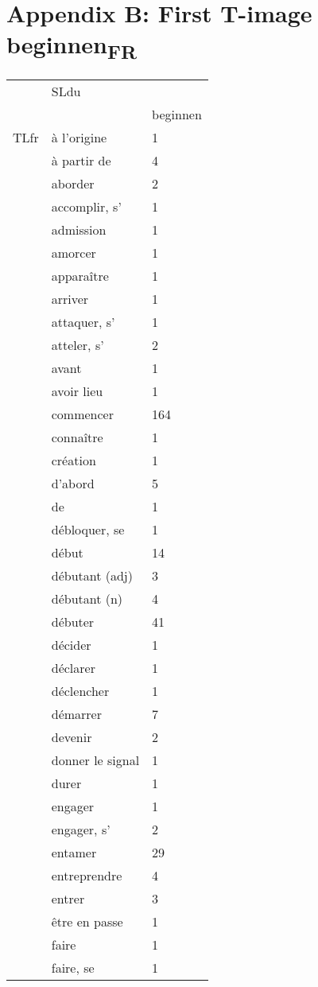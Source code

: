 \section{Appendix B: First T-image beginnen\textsubscript{FR}}
\begin{tabularx}{\textwidth}{XXX}
\lsptoprule
\multicolumn{2}{c}{} & SLdu\\
\hhline{~~-} &  & beginnen\\
\multicolumn{1}{c}{TLfr} & à l'origine &  1\\
& à partir de &  4\\
& aborder &  2\\
& accomplir, s' &  1\\
& admission &  1\\
& amorcer &  1\\
& apparaître &  1\\
& arriver &  1\\
& attaquer, s' &  1\\
& atteler, s' &  2\\
& avant &  1\\
& avoir lieu &  1\\
& commencer &  164\\
& connaître &  1\\
& création &  1\\
& d'abord &  5\\
& de &  1\\
& débloquer, se &  1\\
& début &  14\\
& débutant (adj) &  3\\
& débutant (n) &  4\\
& débuter &  41\\
& décider &  1\\
& déclarer &  1\\
& déclencher &  1\\
& démarrer &  7\\
& devenir &  2\\
& donner le signal &  1\\
& durer &  1\\
& engager &  1\\
& engager, s' &  2\\
& entamer &  29\\
& entreprendre &  4\\
& entrer &  3\\
& être en passe &  1\\
& faire &  1\\
& faire, se &  1\\

\end{tabularx}
